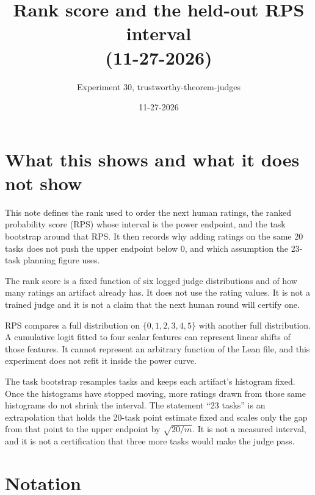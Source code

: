 \documentclass[11pt]{article}
\title{Rank score and the held-out RPS interval\\(11-27-2026)}
\author{Experiment 30, trustworthy-theorem-judges}
\date{11-27-2026}
\begin{document}
\maketitle

\section*{What this shows and what it does not show}

This note defines the rank used to order the next human ratings, the ranked probability score (RPS) whose interval is the power endpoint, and the task bootstrap around that RPS. It then records why adding ratings on the same 20 tasks does not push the upper endpoint below 0, and which assumption the 23-task planning figure uses.

The rank score is a fixed function of six logged judge distributions and of how many ratings an artifact already has. It does not use the rating values. It is not a trained judge and it is not a claim that the next human round will certify one.

RPS compares a full distribution on $\{0,1,2,3,4,5\}$ with another full distribution. A cumulative logit fitted to four scalar features can represent linear shifts of those features. It cannot represent an arbitrary function of the Lean file, and this experiment does not refit it inside the power curve.

The task bootstrap resamples tasks and keeps each artifact's histogram fixed. Once the histograms have stopped moving, more ratings drawn from those same histograms do not shrink the interval. The statement ``23 tasks'' is an extrapolation that holds the 20-task point estimate fixed and scales only the gap from that point to the upper endpoint by $\sqrt{20/m}$. It is not a measured interval, and it is not a certification that three more tasks would make the judge pass.

\section*{Notation}
\end{document}
